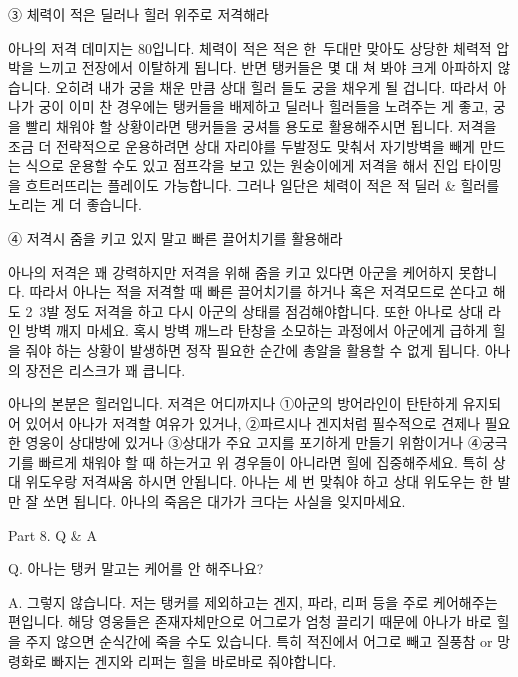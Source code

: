 ③ 체력이 적은 딜러나 힐러 위주로 저격해라

아나의 저격 데미지는 80입니다. 체력이 적은 적은 한~두대만 맞아도 상당한 체력적 압박을 느끼고 전장에서 이탈하게 됩니다. 반면 탱커들은 몇 대 쳐 봐야 크게 아파하지 않습니다. 오히려 내가 궁을 채운 만큼 상대 힐러 들도 궁을 채우게 될 겁니다. 따라서 아나가 궁이 이미 찬 경우에는 탱커들을 배제하고 딜러나 힐러들을 노려주는 게 좋고, 궁을 빨리 채워야 할 상황이라면 탱커들을 궁셔틀 용도로 활용해주시면 됩니다. 저격을 조금 더 전략적으로 운용하려면 상대 자리야를 두발정도 맞춰서 자기방벽을 빼게 만드는 식으로 운용할 수도 있고 점프각을 보고 있는 원숭이에게 저격을 해서 진입 타이밍을 흐트러뜨리는 플레이도 가능합니다. 그러나 일단은 체력이 적은 적 딜러 & 힐러를 노리는 게 더 좋습니다.

 

④ 저격시 줌을 키고 있지 말고 빠른 끌어치기를 활용해라

아나의 저격은 꽤 강력하지만 저격을 위해 줌을 키고 있다면 아군을 케어하지 못합니다. 따라서 아나는 적을 저격할 때 빠른 끌어치기를 하거나 혹은 저격모드로 쏜다고 해도 2~3발 정도 저격을 하고 다시 아군의 상태를 점검해야합니다. 또한 아나로 상대 라인 방벽 깨지 마세요. 혹시 방벽 깨느라 탄창을 소모하는 과정에서 아군에게 급하게 힐을 줘야 하는 상황이 발생하면 정작 필요한 순간에 총알을 활용할 수 없게 됩니다. 아나의 장전은 리스크가 꽤 큽니다.

 

아나의 본분은 힐러입니다. 저격은 어디까지나 ①아군의 방어라인이 탄탄하게 유지되어 있어서 아나가 저격할 여유가 있거나, ②파르시나 겐지처럼 필수적으로 견제나 필요한 영웅이 상대방에 있거나 ③상대가 주요 고지를 포기하게 만들기 위함이거나 ④궁극기를 빠르게 채워야 할 때 하는거고 위 경우들이 아니라면 힐에 집중해주세요. 특히 상대 위도우랑 저격싸움 하시면 안됩니다. 아나는 세 번 맞춰야 하고 상대 위도우는 한 발만 잘 쏘면 됩니다. 아나의 죽음은 대가가 크다는 사실을 잊지마세요.

 

 

 

Part 8. Q & A

 

Q. 아나는 탱커 말고는 케어를 안 해주나요?

 

A. 그렇지 않습니다. 저는 탱커를 제외하고는 겐지, 파라, 리퍼 등을 주로 케어해주는 편입니다. 해당 영웅들은 존재자체만으로 어그로가 엄청 끌리기 때문에 아나가 바로 힐을 주지 않으면 순식간에 죽을 수도 있습니다. 특히 적진에서 어그로 빼고 질풍참 or 망령화로 빠지는 겐지와 리퍼는 힐을 바로바로 줘야합니다.

